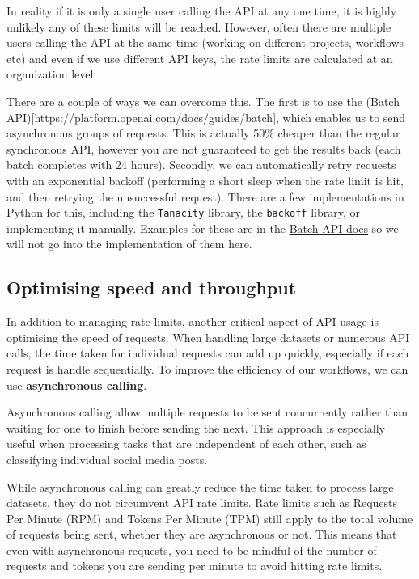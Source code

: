 \documentclass[
  letterpaper,
  DIV=11,
  numbers=noendperiod]{scrreprt}
\begin{document}
In reality if it is only a single user calling the API at any one time,
it is highly unlikely any of these limits will be reached. However,
often there are multiple users calling the API at the same time (working
on different projects, workflows etc) and even if we use different API
keys, the rate limits are calculated at an organization level.

There are a couple of ways we can overcome this. The first is to use the
(Batch API){[}https://platform.openai.com/docs/guides/batch{]}, which
enables us to send asynchronous groups of requests. This is actually
50\% cheaper than the regular synchronous API, however you are not
guaranteed to get the results back (each batch completes with 24 hours).
Secondly, we can automatically retry requests with an exponential
backoff (performing a short sleep when the rate limit is hit, and then
retrying the unsuccessful request). There are a few implementations in
Python for this, including the \texttt{Tanacity} library, the
\texttt{backoff} library, or implementing it manually. Examples for
these are in the
\href{https://platform.openai.com/docs/guides/rate-limits/retrying-with-exponential-backoff}{Batch
API docs} so we will not go into the implementation of them here.

\subsection{Optimising speed and
throughput}\label{optimising-speed-and-throughput}

In addition to managing rate limits, another critical aspect of API
usage is optimising the speed of requests. When handling large datasets
or numerous API calls, the time taken for individual requests can add up
quickly, especially if each request is handle sequentially. To improve
the efficiency of our workflows, we can use \textbf{asynchronous
calling}.

Asynchronous calling allow multiple requests to be sent concurrently
rather than waiting for one to finish before sending the next. This
approach is especially useful when processing tasks that are independent
of each other, such as classifying individual social media posts.

While asynchronous calling can greatly reduce the time taken to process
large datasets, they do not circumvent API rate limits. Rate limits such
as Requests Per Minute (RPM) and Tokens Per Minute (TPM) still apply to
the total volume of requests being sent, whether they are asynchronous
or not. This means that even with asynchronous requests, you need to be
mindful of the number of requests and tokens you are sending per minute
to avoid hitting rate limits.
\end{document}
